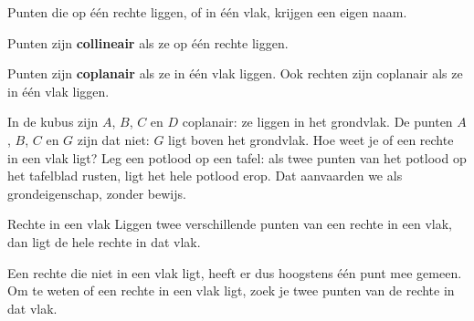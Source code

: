 Punten die op één rechte liggen, of in één vlak, krijgen een eigen naam.

\begin{theorie}
Punten zijn \textbf{\textcolor{accent}{collineair}} als ze op één rechte liggen.

Punten zijn \textbf{\textcolor{accent}{coplanair}} als ze in één vlak liggen. Ook rechten zijn coplanair als ze in één vlak liggen.
\end{theorie}

In de kubus zijn $A$, $B$, $C$ en $D$ coplanair: ze liggen in het grondvlak. De punten $A$, $B$, $C$ en $G$ zijn dat niet: $G$ ligt boven het grondvlak. Hoe weet je of een rechte in een vlak ligt? Leg een potlood op een tafel: als twee punten van het potlood op het tafelblad rusten, ligt het hele potlood erop. Dat aanvaarden we als grondeigenschap, zonder bewijs.

\begin{theorie}
\begin{stelling}{Rechte in een vlak}
Liggen twee verschillende punten van een rechte in een vlak, dan ligt de hele rechte in dat vlak.
\end{stelling}
\end{theorie}

Een rechte die niet in een vlak ligt, heeft er dus hoogstens één punt mee gemeen. Om te weten of een rechte in een vlak ligt, zoek je twee punten van de rechte in dat vlak.


